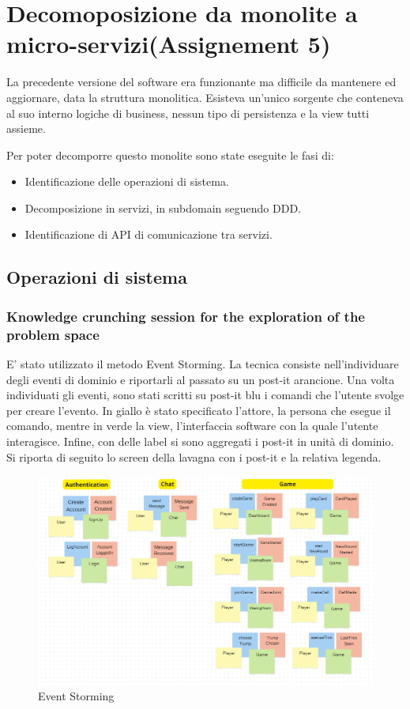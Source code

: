 \chapter{Decomoposizione da monolite a micro-servizi(Assignement 5)}
\label{ch:decomposition}

La precedente versione del software era funzionante ma difficile da mantenere ed aggiornare, data la struttura monolitica.
Esisteva un'unico sorgente che conteneva al suo interno logiche di business, nessun tipo di persistenza e la view tutti assieme.

Per poter decomporre questo monolite sono state eseguite le fasi di: 
\begin{itemize}
  \item Identificazione delle operazioni di sistema.
  \item Decomposizione in servizi, in subdomain seguendo DDD.
  \item Identificazione di API di comunicazione tra servizi.
\end{itemize}

\section{Operazioni di sistema}


\subsection{Knowledge crunching session for the exploration of the problem space}
E' stato utilizzato il metodo Event Storming. 
La tecnica consiste nell'individuare degli eventi di dominio e riportarli al passato su un post-it arancione.
Una volta individuati gli eventi, sono stati scritti su post-it blu i comandi che l'utente svolge per creare l'evento.
In giallo è stato specificato l'attore, la persona che esegue il comando, mentre in verde la view, l'interfaccia software
 con la quale l'utente interagisce.
 Infine, con delle label si sono aggregati i post-it in unità di dominio.
 Si riporta di seguito lo screen della lavagna con i post-it e la relativa legenda.
 \begin{figure}[h!]
    \centering 
    \includegraphics[scale=0.45]{report/img/EventStorming.png}
    \caption{Event Storming}
    \label{event_storming}
\end{figure}


